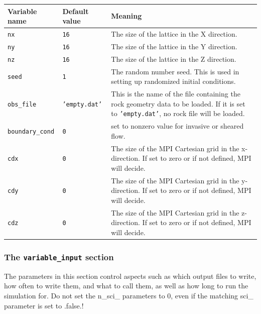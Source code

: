 \documentclass[a4paper]{article}
\begin{document}
\begin{center}
\begin{tabular}{|l|l|p{}|}
\hline
Variable name	&	Default value	&	Meaning \\
\hline
{\tt nx }	&	{\tt 16 }	&	
		The size of the lattice in the X direction.\\
\hline
{\tt ny }	&	{\tt 16 }	&
		The size of the lattice in the Y direction.\\
\hline
{\tt nz }	&	{\tt 16 }	&
		The size of the lattice in the Z direction.\\
\hline
{\tt seed }	&	{\tt 1 }	&
		The random number seed. This is used in setting up
		randomized initial conditions.\\
\hline
{\tt obs\_file }	&	{\tt 'empty.dat' }	&
		This is the name of the file containing the rock
		geometry data to be loaded. If it is set to 
		{\tt 'empty.dat'}, no rock file will be loaded.\\
\hline
{\tt boundary\_cond }	&	{\tt 0 }	&
		set to nonzero value for invasive or sheared flow.\\
\hline
{\tt cdx } & {\tt 0 }  &
    The size of the MPI Cartesian grid in the x-direction.
    If set to zero or if not defined, MPI will decide. \\
\hline
{\tt cdy } & {\tt 0 }  &
    The size of the MPI Cartesian grid in the y-direction.
    If set to zero or if not defined, MPI will decide. \\
\hline
{\tt cdz } & {\tt 0 }  &
    The size of the MPI Cartesian grid in the z-direction.
    If set to zero or if not defined, MPI will decide. \\
\hline



\end{tabular}
\end{center}

\newpage

\subsubsection{The {\tt variable\_input} section}

The parameters in this section control aspects such as which output
files to write, how often to write them, and what to call them, as
well as how long to run the simulation for. Do not set the n\_sci\_
parameters to 0, even if the matching sci\_ parameter is set to .false.!
\end{document}
